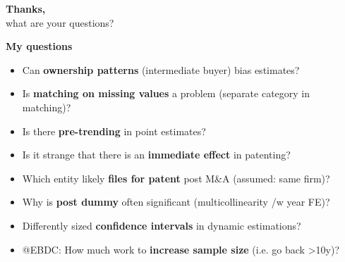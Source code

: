 \documentclass{beamer} %
\newcommand*\circled[1]{\tikz[baseline=(char.base)]{
		\node[shape=circle,inner sep=2pt, fill = lightgray!30] (char) {#1};}} %
\newcommand{\backupbegin}{
	\newcounter{finalframe}
	\setcounter{finalframe}{\value{framenumber}}
}
\begin{document}
{
\begin{frame}[plain]		
	\vspace{1cm}
	{\color{white}\huge \textbf{Thanks,}\\ \vspace{.4cm} \Large what are your questions?}
		
		
\end{frame}
}

\appendix
\backupbegin

\begin{frame}{\textbf{My questions}}
	\begin{itemize}
	    \item Can \textbf{ownership patterns} (intermediate buyer) bias estimates?
	    \item Is \textbf{matching on missing values} a problem (separate category in matching)?
	    \item Is there \textbf{pre-trending} in point estimates?
	    \item Is it strange that there is an \textbf{immediate effect} in patenting?
	    \item Which entity likely \textbf{files for patent} post M\&A (assumed: same firm)?
	    \item Why is \textbf{post dummy} often significant (multicollinearity /w year FE)?
	    \item Differently sized \textbf{confidence intervals} in dynamic estimations?
	    \item @EBDC: How much work to \textbf{increase sample size} (i.e. go back >10y)?
	\end{itemize}
\end{frame}
\end{document}
